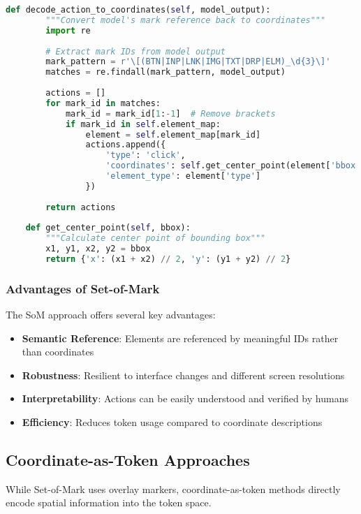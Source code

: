 \begin{lstlisting}[language=Python, caption=Set-of-Mark implementation for GUI understanding]
    def decode_action_to_coordinates(self, model_output):
        """Convert model's mark reference back to coordinates"""
        import re
        
        # Extract mark IDs from model output
        mark_pattern = r'\[(BTN|INP|LNK|IMG|TXT|DRP|ELM)_\d{3}\]'
        matches = re.findall(mark_pattern, model_output)
        
        actions = []
        for mark_id in matches:
            mark_id = mark_id[1:-1]  # Remove brackets
            if mark_id in self.element_map:
                element = self.element_map[mark_id]
                actions.append({
                    'type': 'click',
                    'coordinates': self.get_center_point(element['bbox']),
                    'element_type': element['type']
                })
        
        return actions
    
    def get_center_point(self, bbox):
        """Calculate center point of bounding box"""
        x1, y1, x2, y2 = bbox
        return {'x': (x1 + x2) // 2, 'y': (y1 + y2) // 2}
\end{lstlisting}

\subsubsection{Advantages of Set-of-Mark}

The SoM approach offers several key advantages:

\begin{itemize}
\item \textbf{Semantic Reference}: Elements are referenced by meaningful IDs rather than coordinates
\item \textbf{Robustness}: Resilient to interface changes and different screen resolutions
\item \textbf{Interpretability}: Actions can be easily understood and verified by humans
\item \textbf{Efficiency}: Reduces token usage compared to coordinate descriptions
\end{itemize}

\subsection{Coordinate-as-Token Approaches}

While Set-of-Mark uses overlay markers, coordinate-as-token methods directly encode spatial information into the token space.

